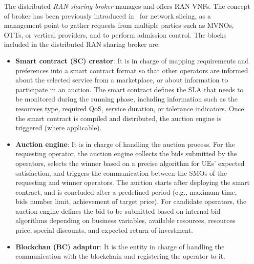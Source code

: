 \documentclass[journal]{IEEEtran}
\begin{document}
	The distributed \textit{RAN sharing broker} manages and offers RAN VNFs. The concept of broker has been previously introduced in~\cite{samdanis2016network} for network slicing, as a management point to gather requests from multiple parties such as MVNOs, OTTs, or vertical providers, and to perform admission control. The blocks included in the distributed RAN sharing broker are:
	\begin{itemize}
		\item \textbf{Smart contract (SC) creator}: It is in charge of mapping requirements and preferences into a smart contract format so that other operators are informed about the selected service from a marketplace, or about information to participate in an auction. The smart contract defines the SLA that needs to be monitored during the running phase, including information such as the resources type, required QoS, service duration, or tolerance indicators. Once the smart contract is compiled and distributed, the auction engine is triggered (where applicable).
		\item \textbf{Auction engine}: It is in charge of handling the auction process. For the requesting operator, the auction engine collects the bids submitted by the operators, selects the winner based on a precise algorithm for UEs' expected satisfaction, and triggers the communication between the SMOs of the requesting and winner operators. The auction starts after deploying the smart contract, and is concluded after a predefined period (e.g., maximum time, bids number limit, achievement of target price). For candidate operators, the auction engine defines the bid to be submitted based on internal bid algorithms depending on business variables, available resources, resources price, special discounts, and expected return of investment.
		\item \textbf{Blockchan (BC) adaptor}: It is the entity in charge of handling the communication with the blockchain and registering the operator to it.
	\end{itemize}
	
\end{document}
